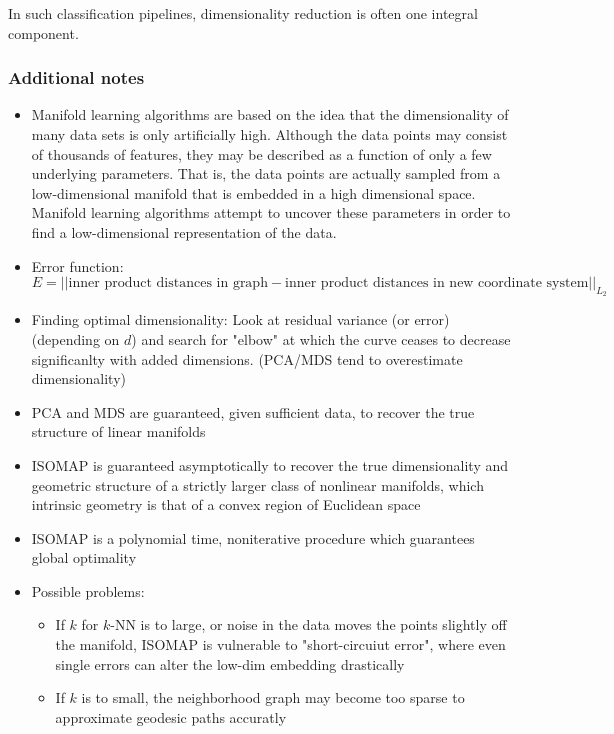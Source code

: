 In such classification pipelines, dimensionality reduction is often one integral component.

\subsubsection*{Additional notes}
\begin{itemize}
    \item Manifold learning algorithms are based on the idea that the dimensionality of many data sets is only artificially high. Although the data points may consist of thousands of features, they may be described as a function of only a few underlying parameters. That is, the data points are actually sampled from a low-dimensional manifold that is embedded in a high dimensional space. Manifold learning algorithms attempt to uncover these parameters in order to find a low-dimensional representation of the data.
    \item Error function: \[E = ||\text{inner product distances in graph} - \text{inner product distances in new coordinate system}||_{L_2}\]
    \item Finding optimal dimensionality: Look at residual variance (or error) (depending on \(d\)) and search for "elbow" at which the curve ceases to decrease significanlty with added dimensions. (PCA/MDS tend to overestimate dimensionality)
    \item PCA and MDS are guaranteed, given sufficient data, to recover the true structure of linear manifolds
    \item ISOMAP is guaranteed asymptotically to recover the true dimensionality and geometric structure of a strictly larger class of nonlinear manifolds, which intrinsic geometry is that of a convex region of Euclidean space
    \item ISOMAP is a polynomial time, noniterative procedure which guarantees global optimality
    \item Possible problems:

        \begin{itemize}
            \item If \(k\) for \(k\)-NN is to large, or noise in the data moves the points slightly off the manifold, ISOMAP is vulnerable to "short-circuiut error", where even single errors can alter the low-dim embedding drastically
            \item If \(k\) is to small, the neighborhood graph may become too sparse to approximate geodesic paths accuratly
        \end{itemize}

\end{itemize}
